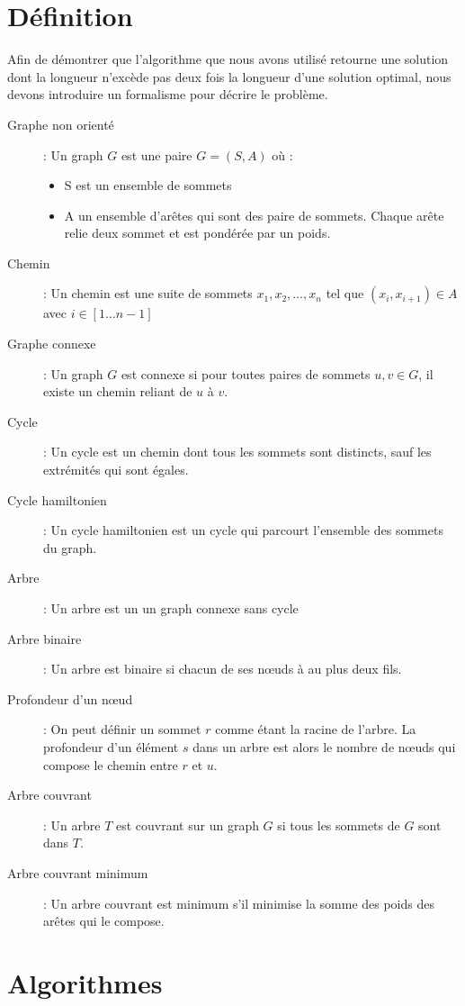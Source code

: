 \documentclass[a4paper,11pt]{article}
\begin{document}
\section{Définition} %
Afin de démontrer que l'algorithme que nous avons utilisé retourne une solution dont la longueur n'excède pas deux fois la longueur d'une solution optimal, nous devons introduire un formalisme pour décrire le problème.
\begin{description}
 \item[Graphe non orienté] : Un graph $G$ est une paire $G = (S, A)$ où :
 \begin{itemize}
 \renewcommand{\FrenchLabelItem}{\textbullet}
  \item S est un ensemble de sommets
  \item A un ensemble d'arêtes qui sont des paire de sommets. Chaque arête relie deux sommet et est pondérée par un poids.
 \end{itemize}
 \item[Chemin] : Un chemin est une suite de sommets $x_1, x_2, \ldots, x_n$ tel que $\left(x_i, x_{i+1}\right) \in A$ avec $i \in \left[1\ldots n-1\right]$
 \item[Graphe connexe] : Un graph $G$ est connexe si pour toutes paires de sommets $u, v \in G$, il existe un chemin reliant de $u$ à $v$.
 \item[Cycle] : Un cycle est un chemin dont tous les sommets sont distincts, sauf les extrémités qui sont égales.
 \item[Cycle hamiltonien] : Un cycle hamiltonien est un cycle qui parcourt l'ensemble des sommets du graph.
 \item[Arbre] : Un arbre est un un graph connexe sans cycle
 \item[Arbre binaire] : Un arbre est binaire si chacun de ses nœuds à au plus deux fils.
 \item[Profondeur d'un nœud] : On peut définir un sommet $r$ comme étant la racine de l'arbre. La profondeur d'un élément $s$ dans un arbre est alors le nombre de nœuds qui compose le chemin entre $r$ et $u$.
 \item[Arbre couvrant] : Un arbre $T$ est couvrant sur un graph $G$ si tous les sommets de $G$ sont dans $T$.
 \item[Arbre couvrant minimum] : Un arbre couvrant est minimum s'il minimise la somme des poids des arêtes qui le compose.
\end{description}

\section{Algorithmes}
\end{document}

